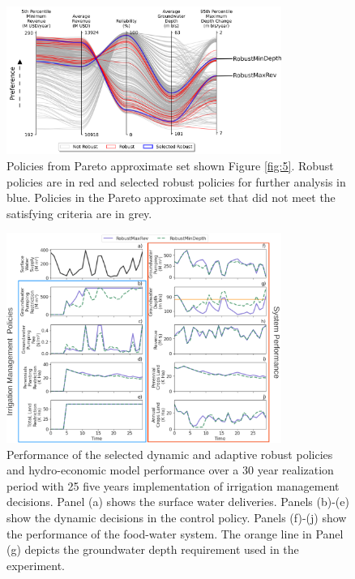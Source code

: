 \documentclass[a4paper,fleqn]{cas-sc}
\begin{document}
\begin{figure}[htb!]
    \includegraphics[width=0.8\textwidth,center]{./figs/selected_robust.png}
    \caption{Policies from Pareto approximate set shown Figure \ref{fig:5}. Robust policies are in red and selected robust policies for further analysis in blue. Policies in the Pareto approximate set that did not meet the satisfying criteria are in grey.} \label{fig:7}
\end{figure} 

\begin{figure}[htb!]
    \includegraphics[width=0.8\textwidth,center]{./figs/robust_highsd_performance.png}
    \caption{Performance of the selected dynamic and adaptive robust policies and hydro-economic model performance over a 30 year realization period with 25 five years implementation of irrigation management decisions. Panel (a) shows the surface water deliveries. Panels (b)-(e) show the dynamic decisions in the control policy. Panels (f)-(j) show the performance of the food-water system. The orange line in Panel (g) depicts the groundwater depth requirement used in the experiment.} \label{fig:8}
\end{figure}

\clearpage
\end{document}
